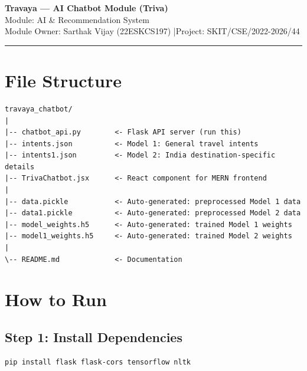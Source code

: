 \documentclass[12pt,a4paper]{article}
\begin{document}

\begin{center}
  {\LARGE\bfseries\color{travayagreen} Travaya --- AI Chatbot Module (Triva)}\\[6pt]
  {\large Module: AI \& Recommendation System}\\[4pt]
  {\normalsize Module Owner: Sarthak Vijay (22ESKCS197) \quad|\quad Project: SKIT/CSE/2022-2026/44}
\end{center}

\vspace{6pt}
\noindent\rule{\textwidth}{1.2pt}
\vspace{4pt}

\section{File Structure}

\begin{lstlisting}
travaya_chatbot/
|
|-- chatbot_api.py        <- Flask API server (run this)
|-- intents.json          <- Model 1: General travel intents
|-- intents1.json         <- Model 2: India destination-specific details
|-- TrivaChatbot.jsx      <- React component for MERN frontend
|
|-- data.pickle           <- Auto-generated: preprocessed Model 1 data
|-- data1.pickle          <- Auto-generated: preprocessed Model 2 data
|-- model_weights.h5      <- Auto-generated: trained Model 1 weights
|-- model1_weights.h5     <- Auto-generated: trained Model 2 weights
|
\-- README.md             <- Documentation
\end{lstlisting}

\section{How to Run}

\subsection{Step 1: Install Dependencies}

\begin{lstlisting}[language=bash]
pip install flask flask-cors tensorflow nltk
\end{lstlisting}
\end{document}
